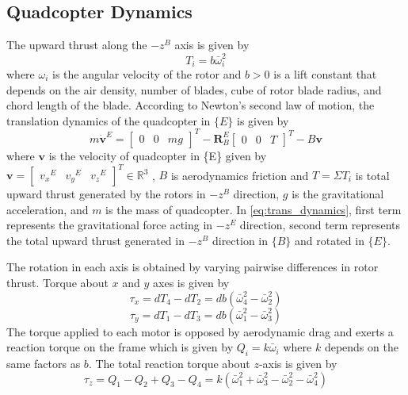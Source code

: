 \documentclass[letterpaper, 10 pt, conference]{ieeeconf}
\begin{document}
\subsection{Quadcopter Dynamics}\label{subsec:qd}
The upward thrust along the $-z^{B}$ axis is given by
\begin{equation*}
    T_{i} = b\bar{\omega}_{i}^2
\end{equation*}
where $\omega_{i}$ is the angular velocity of the rotor and $b>0$ is a lift constant that depends on the air density, number of blades, cube of rotor blade radius, and chord length of the blade.
According to Newton's second law of motion, the translation dynamics of the quadcopter in $\{E\}$ is given by
\begin{equation}
    m\dot{\mathbf{v}}^{E}=\begin{bmatrix}
        0 & 0 & m g
    \end{bmatrix}^{T}-\mathbf{R}_{B}^{E}\begin{bmatrix}
        0 & 0 & T
    \end{bmatrix}^{T} - B\mathbf{v}\label{eq:trans_dynamics}
\end{equation}
where $\mathbf{v}$ is the velocity of quadcopter in \{E\} given by $\mathbf{v} =\begin{bmatrix}  {v_{x}}^{E} & {v_{y}}^{E} & {v_{z}}^{E} \end{bmatrix}^{T} \in \mathbb{R}^{3}$ , $B$ is aerodynamics friction and  $T = \Sigma T_{i}$ is total upward thrust generated by the rotors in $-z^{B}$ direction, $g$ is the gravitational acceleration, and $m$ is the mass of quadcopter. In \eqref{eq:trans_dynamics}, first term represents the gravitational force acting in $-z^{E}$ direction, second term represents the total upward thrust generated in  $-z^{B}$ direction in $\{B\}$ and rotated in $\{E\}$.

The rotation in each axis is obtained by varying pairwise differences in rotor thrust. Torque about $x$ and $y$ axes is given by
\begin{equation*}
    \tau_{x}=d T_{4}-d T_{2} = db(\bar{\omega}_{4}^{2}-\bar{\omega}_{2}^{2})
\end{equation*}
\begin{equation*}
    \tau_{y}=d T_{1}-d T_{3} = db(\bar{\omega}_{1}^{2}-\bar{\omega}_{3}^{2})
\end{equation*}
The torque applied to each motor is opposed by aerodynamic drag and exerts a reaction torque on the frame which is given by $Q_{i}=k\bar{\omega}_{i}$ where $k$ depends on the same factors as $b$.
The total reaction torque about $z$-axis is given by
\begin{equation}
    \tau_{z} =Q_{1}-Q_{2}+Q_{3}-Q_{4}=k\left(\bar{\omega}_{1}^{2}+\bar{\omega}_{3}^{2}-\bar{\omega}_{2}^{2}-\bar{\omega}_{4}^{2}\right)\label{eq:react_torque_z}
\end{equation}
\end{document}
